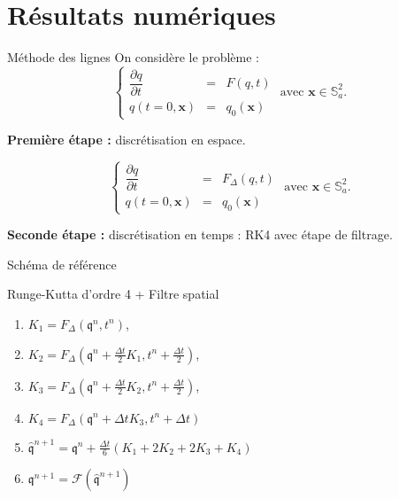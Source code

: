 \documentclass[11pt]{beamer}
\begin{document}
\section{Résultats numériques}
\begin{frame}{Méthode des lignes}
On considère le problème :
$$
\left\lbrace
\begin{array}{rcl}
\dfrac{\partial q}{\partial t} & = & F(q,t) \\
q(t=0,\mathbf{x}) & = & q_0(\mathbf{x})
\end{array}
\right. \text{ avec } \mathbf{x} \in \mathbb{S}_a^2.
$$
\begin{block}{}
\textbf{Première étape : } discrétisation en espace.
\end{block}
$$
\left\lbrace
\begin{array}{rcl}
\dfrac{\partial q}{\partial t} & = & F_{\Delta}(q,t) \\
q(t=0,\mathbf{x}) & = & q_0(\mathbf{x})
\end{array}
\right. \text{ avec } \mathbf{x} \in \mathbb{S}_a^2.
$$
\begin{block}{}
\textbf{Seconde étape : } discrétisation en temps : RK4 avec étape de filtrage.
\end{block}
\end{frame}






\begin{frame}{Schéma de référence}
\begin{block}{Runge-Kutta d'ordre 4 + Filtre spatial
}
\begin{enumerate}
\item $K_1 = F_{\Delta}(\mathfrak{q}^n, t^n)$,
\item $K_2 = F_{\Delta}(\mathfrak{q}^n + \frac{\Delta t}{2} K_1, t^n + \frac{\Delta t}{2})$,
\item $K_3 = F_{\Delta}(\mathfrak{q}^n + \frac{\Delta t}{2} K_2, t^n + \frac{\Delta t}{2})$,
\item $K_4 = F_{\Delta}(\mathfrak{q}^n + \Delta t K_3, t^n + \Delta t)$
\item $\hat{\mathfrak{q}}^{n+1} = \mathfrak{q}^n + \frac{\Delta t}{6} \left( K_1 + 2 K_2 + 2 K_3 + K_4 \right)$
\item $\mathfrak{q}^{n+1} = \mathcal{F}(\hat{\mathfrak{q}}^{n+1})$
\end{enumerate}
\end{block}
\end{frame}
\end{document}
